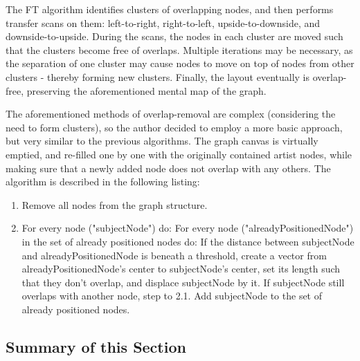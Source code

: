 The FT algorithm identifies clusters of overlapping nodes, and then performs transfer scans on them: left-to-right, right-to-left, upside-to-downside, and downside-to-upside. During the scans, the nodes in each cluster are moved such that the clusters become free of overlaps. Multiple iterations may be necessary, as the separation of one cluster may cause nodes to move on top of nodes from other clusters - thereby forming new clusters. Finally, the layout eventually is overlap-free, preserving the aforementioned mental map of the graph.

The aforementioned methods of overlap-removal are complex (considering the need to form clusters), so the author decided to employ a more basic approach, but very similar to the previous algorithms. The graph canvas is virtually emptied, and re-filled one by one with the originally contained artist nodes, while making sure that a newly added node does not overlap with any others. The algorithm is described in the following listing:

\begin{enumerate}
\item Remove all nodes from the graph structure.	
\item For every node ("subjectNode") do:
	\subitem For every node ("alreadyPositionedNode") in the set of already positioned nodes do:
	\subsubitem If the distance between subjectNode and alreadyPositionedNode is beneath a
	threshold, create a vector from alreadyPositionedNode's center to subjectNode's center, set
	its length such that they don't overlap, and displace subjectNode by it.
	\subsubitem If subjectNode still overlaps with another node, step to 2.1.
	\subsubitem Add subjectNode to the set of already positioned nodes.
\end{enumerate}

\subsection{Summary of this Section}